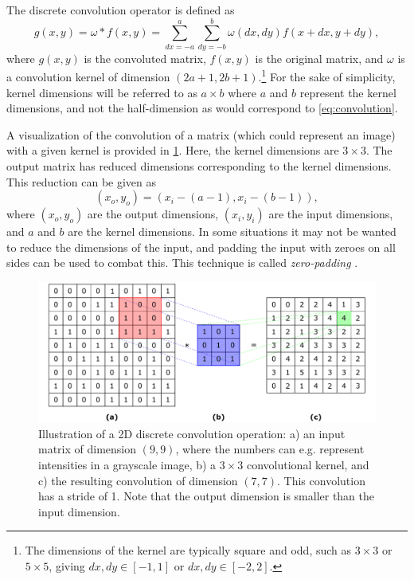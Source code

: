 The discrete convolution operator is defined as \cite[899-901]{cormenalgorithms}
\begin{equation}
    \label{eq:convolution}
    g(x,y) = \omega \ast f(x,y) = \sum_{dx=-a}^{a}\sum_{dy=-b}^{b} \omega(dx,dy)f(x+dx,y+dy),
\end{equation}
where $g(x,y)$ is the convoluted matrix, $f(x,y)$ is the original matrix, and $\omega$ is a convolution kernel of dimension $(2a+1,2b+1)$.\footnote{The dimensions of the kernel are typically square and odd, such as $3\times3$ or $5\times5$, giving $dx,dy\in[-1,1]$ or $dx,dy\in[-2,2]$. } For the sake of simplicity, kernel dimensions will be referred to as $a\times b$ where $a$ and $b$ represent the kernel dimensions, and not the half-dimension as would correspond to \cref{eq:convolution}. 

A visualization of the convolution of a matrix (which could represent an image) with a given kernel is provided in \cref{fig:convolution}. Here, the kernel dimensions are $3\times3$. The output matrix has reduced dimensions corresponding to the kernel dimensions. This reduction can be given as 
\begin{equation}
    \left( x_o,y_o \right) = \left( x_i - \left(a - 1\right), x_i - \left( b - 1 \right) \right),
\end{equation}
where $(x_o,y_o)$ are the output dimensions, $(x_i,y_i)$ are the input dimensions, and $a$ and $b$ are the kernel dimensions. In some situations it may not be wanted to reduce the dimensions of the input, and padding the input with zeroes on all sides can be used to combat this. This technique is called \textit{zero-padding} \cite{oshea2015introduction}. 
\begin{figure}[htbp]  
    \centering
    \includegraphics[width=.85\textwidth]{figures/convolution.pdf}
    \caption[Illustration of a 2D discrete convolution]{Illustration of a 2D discrete convolution operation: a) an input matrix of dimension $(9,9)$, where the numbers can e.g. represent intensities in a grayscale image, b) a $3\times3$ convolutional kernel, and c) the resulting convolution of dimension $(7,7)$. This convolution has a stride of 1. Note that the output dimension is smaller than the input dimension. }
    \label{fig:convolution}
\end{figure}

